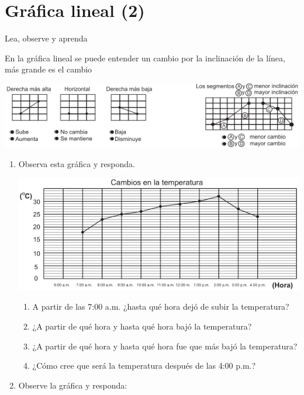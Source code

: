 \documentclass[10pt,twoside]{article}
\begin{document}
\section*{Gráfica lineal (2)}
Lea, observe y aprenda

En la gráfica lineal se puede entender un cambio por la inclinación de la línea, más grande es el cambio
\begin{center}
\includegraphics[scale=.65]{Images/graficalineal03.png} 
\end{center}
\begin{enumerate}
\item Observa esta gráfica y responda.
\begin{center}
\includegraphics[scale=.65]{Images/grafica04.png} 
\end{center}
\begin{enumerate}
\item A partir de las 7:00 a.m. ¿hasta qué hora dejó de subir la temperatura?
\item ¿A partir de qué hora y hasta qué hora bajó la temperatura?
\item ¿A partir de qué hora y hasta qué hora fue que más bajó la temperatura?
\item ¿Cómo cree que será la temperatura después de las 4:00 p.m.?
\end{enumerate}
\item Observe la gráfica y responda:


\end{enumerate}
\end{document}
